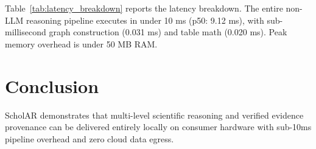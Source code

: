 \documentclass[11pt,a4paper]{article}
\begin{document}
Table~\ref{tab:latency_breakdown} reports the latency breakdown. The entire non-LLM reasoning pipeline executes in under 10 ms (p50: 9.12 ms), with sub-millisecond graph construction (0.031 ms) and table math (0.020 ms). Peak memory overhead is under 50 MB RAM.

\section{Conclusion}
ScholAR demonstrates that multi-level scientific reasoning and verified evidence provenance can be delivered entirely locally on consumer hardware with sub-10ms pipeline overhead and zero cloud data egress.
\end{document}
